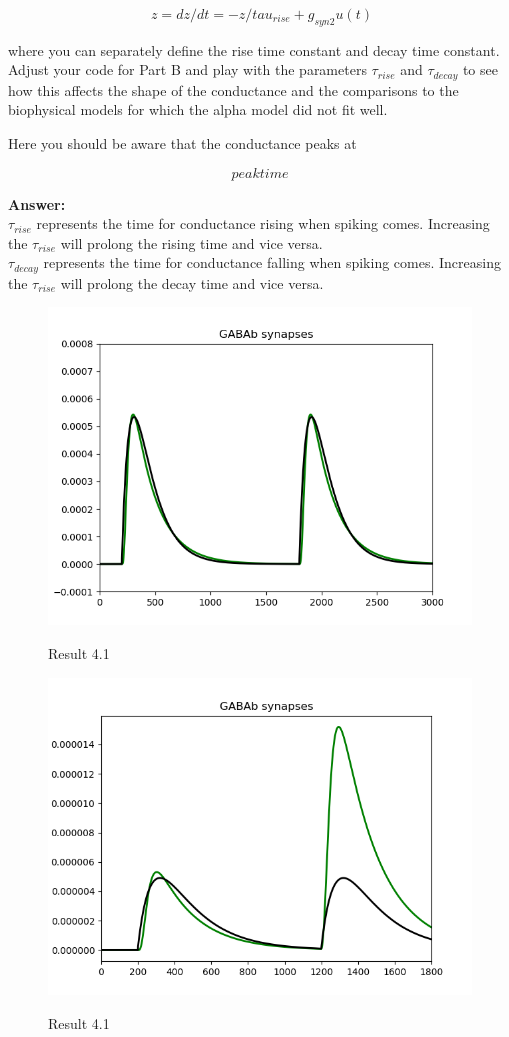 \documentclass[12pt]{article}
\begin{document}
$$ z= dz/dt =
−z/tau_{rise}
+g_{syn2}u(t)$$
 
where you can separately define the rise time constant and decay time constant. Adjust your code for Part B and play with the parameters $\tau_{rise}$  and $\tau_{decay}$ to see how this affects the shape of the conductance and the comparisons to the biophysical models for which the alpha model did not fit well. 
 
Here you should be aware that the conductance peaks at 
 
$$peaktime $$

\textbf{Answer:} 
\\

$\tau_{rise}$ represents the time for conductance rising when spiking comes. Increasing the $\tau_{rise}$ will prolong the rising time and vice versa. 
\\

$\tau_{decay}$ represents the time for conductance falling when spiking comes. Increasing the $\tau_{rise}$ will prolong the decay time and vice versa. 

 \begin{figure}[H]
  \centering
  \includegraphics[width=.8\textwidth]{h2_p2_2_GABAb_fixed2.png} %
  \label{img} %
  \caption{Result 4.1}
\end{figure}
\begin{figure}[H]
  \centering
  \includegraphics[width=.8\textwidth]{h2_p2_2_GABAb_fixed.png} %
  \label{img} %
  \caption{Result 4.1}
\end{figure}
\end{document}
